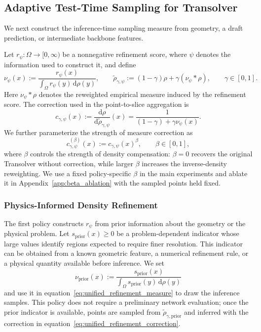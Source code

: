 \documentclass{article}
\def\eqref#1{equation~\ref{#1}}
\begin{document}
\subsection{Adaptive Test-Time Sampling for Transolver}
\label{sec:adaptive_test_time_sampling}

We next construct the inference-time sampling measure from geometry, a draft prediction, or intermediate backbone features.

Let $r_{\psi}:\Omega\to[0,\infty)$ be a nonnegative refinement score, where $\psi$ denotes the information used to construct it, and define
\begin{equation}
    \nu_{\psi}(x)
    :=\frac{r_{\psi}(x)}{\int_{\Omega}r_{\psi}(y)\,\mathrm{d}\rho(y)},
    \qquad
    \widetilde{\rho}_{\gamma,\psi}
    :=(1-\gamma)\rho+\gamma(\nu_{\psi}*\rho),
    \qquad \gamma\in[0,1].
    \label{eq:unified_refinement_measure}
\end{equation}
Here $\nu_{\psi}*\rho$ denotes the reweighted empirical measure induced by the refinement score. The correction used in the point-to-slice aggregation is
\begin{equation}
    c_{\gamma,\psi}(x)
    :=\frac{\mathrm{d}\rho}{\mathrm{d}\widetilde{\rho}_{\gamma,\psi}}(x)
    =\frac{1}{(1-\gamma)+\gamma\nu_{\psi}(x)}.
    \label{eq:unified_refinement_correction}
\end{equation}
We further parameterize the strength of measure correction as
\begin{equation}
    c_{\gamma,\psi}^{(\beta)}(x)
    := c_{\gamma,\psi}(x)^{\beta},
    \qquad \beta\in[0,1],
\end{equation}
where $\beta$ controls the strength of density compensation: $\beta=0$ recovers the original Transolver without correction, while larger $\beta$ increases the inverse-density reweighting. We use a fixed policy-specific $\beta$ in the main experiments and ablate it in Appendix~\ref{app:beta_ablation} with the sampled points held fixed.
\subsubsection{Physics-Informed Density Refinement}
\label{sec:physics_informed_refinement}

The first policy constructs $r_{\psi}$ from prior information about the geometry
or the physical problem. Let $s_{\mathrm{prior}}(x)\geq0$ be a problem-dependent
indicator whose large values identify regions expected to require finer resolution.
This indicator can be obtained from a known geometric feature, a numerical
refinement rule, or a physical quantity available before inference. We set
\begin{equation}
    \nu_{\mathrm{prior}}(x)
    :=\frac{s_{\mathrm{prior}}(x)}{\int_{\Omega}s_{\mathrm{prior}}(y)\,\mathrm{d}\rho(y)}
    \label{eq:prior_refinement_kernel}
\end{equation}
and use it in \eqref{eq:unified_refinement_measure} to draw the inference samples. This policy does not require a preliminary network evaluation; once the prior indicator is available, points are sampled from $\widetilde{\rho}_{\gamma,\mathrm{prior}}$ and inferred with the correction in \eqref{eq:unified_refinement_correction}.
\end{document}
